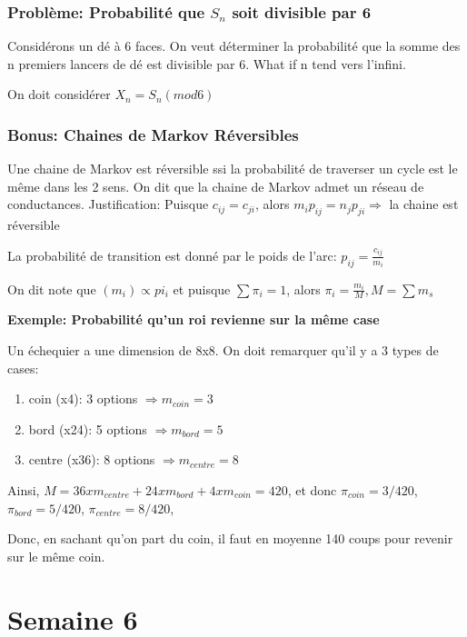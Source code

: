 \documentclass{article}
\begin{document}
\subsubsection{Problème: Probabilité que $S_n$ soit divisible par 6}%
\label{ssub:Problème: Probabilité que $S_n$ soit divisible par 6}

Considérons un dé à 6 faces. On veut déterminer la probabilité que la
somme des n premiers lancers de dé est divisible par 6. What if n tend vers
l'infini.

On doit considérer $X_n = S_n (mod 6)$

\subsubsection{Bonus: Chaines de Markov Réversibles}

Une chaine de Markov est réversible ssi la probabilité de traverser un cycle
est le même dans les 2 sens. On dit que la chaine de Markov admet un
réseau de conductances. Justification: Puisque $c_{ij} =c_{ji}$, alors
$m_i p_{ij} = n_j p_{ji} \Longrightarrow$ la chaine est réversible

La probabilité de transition est donné par le poids de l'arc:
$p_{ij} = \frac{c_{ij}}{m_i} $

On dit note que $(m_i) \propto pi _i$ et puisque $\sum \pi _i =1$, alors
$ \pi _i = \frac{m_i}{M} , M= \sum m_s$

\textbf{Exemple: Probabilité qu'un roi revienne sur la même case}

Un échequier a une dimension de 8x8. On doit remarquer qu'il y a 3 types
de cases:
\begin{enumerate}
    \item coin (x4): 3 options $ \Longrightarrow m_{coin} = 3$
    \item bord (x24): 5 options $ \Longrightarrow m_{bord} = 5$
    \item centre (x36): 8 options $ \Longrightarrow m_{centre} = 8$

\end{enumerate}

Ainsi, $ M= 36 x m_{centre} + 24 x m_{bord} + 4 x m_{coin} = 420$,
et donc $\pi_{coin} = 3/420$, $\pi_{bord}=5/420$, $\pi _{centre}=8/420$,

Donc, en sachant qu'on part du coin, il faut en moyenne 140 coups pour
revenir sur le même coin.

\pagebreak
\section{Semaine 6}
\end{document}
